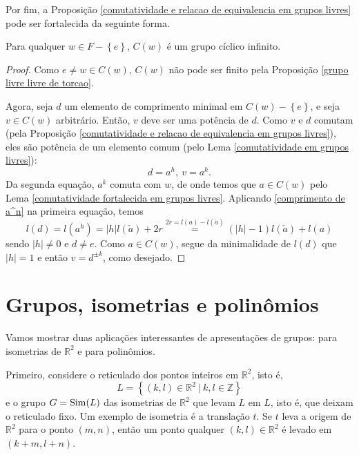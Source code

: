     	Por fim, a 
    	Proposição \ref{comutatividade e relacao de equivalencia em grupos livres} pode ser 
    	fortalecida da seguinte forma.
    	\begin{theorem}
    	\label{centralizadores em grupos livres}
    		Para qualquer $w\in F - \left\{ e \right\}$, $C(w)$ é um grupo cíclico infinito.
    	\end{theorem}
    	\begin{proof}
    		Como $e\neq w\in C(w)$, $C(w)$ não pode ser finito pela 
    		Proposição \ref{grupo livre livre de torcao}.
    		
    		\par\vspace{0.3cm} Agora, seja $d$ um elemento de comprimento minimal em 
    		$C(w) - \left\{ e \right\}$, e seja $v\in C(w)$ arbitrário. Então, $v$ deve ser uma potência de $d$.
    		Como $v$ e $d$ comutam (pela 
    		Proposição \ref{comutatividade e relacao de equivalencia em grupos livres}), eles são potência 
    		de um elemento comum (pelo Lema \ref{comutatividade em grupos livres}):
    		\begin{equation*}
    		    d = a^h, \ v = a^k.
    		\end{equation*}
    		Da segunda equação, $a^k$ comuta com $w$, de onde temos que $a\in C(w)$ 
    		pelo Lema \ref{comutatividade fortalecida em grupos livres}. Aplicando 
    		\eqref{comprimento de a^n} 
    		na primeira equação, temos
    		\begin{equation*}
    		    l(d) = l(a^h) 
    		    = |h|l(\check{a}) + 2r \stackrel{2r = l(a) - l(\check{a})}{=} (|h| - 1)l(\check{a}) + l(a)
    		\end{equation*}
    		sendo $|h|\neq 0$ e $d\neq e$. Como $a\in C(w)$, segue da minimalidade de 
    		$l(d)$ que $|h| = 1$ e então $v = d^{\pm k}$, como desejado.
    	\end{proof}
	\section{Grupos, isometrias e polinômios}
    	Vamos mostrar duas aplicações interessantes de apresentações de grupos: para isometrias 
    	de $\mathbb{R}^2$ e para polinômios.
    	
    	\par\vspace{0.3cm} Primeiro, considere o reticulado dos pontos inteiros em $\mathbb{R}^2$, isto é,
    	\begin{equation*}
    	    L = \left\{ (k,l)\in\mathbb{R}^2 \ | \ k,l\in\mathbb{Z} \right\}
    	\end{equation*}
    	e o grupo $G = \operatorname{Sim}(L)$ das isometrias de $\mathbb{R}^2$ que levam $L$ em $L$, 
    	isto é, que deixam o reticulado fixo. Um exemplo de isometria é a translação $t$. Se $t$ leva a 
    	origem de $\mathbb{R}^2$ para o ponto $(m,n)$, então um ponto qualquer $(k,l)\in\mathbb{R}^2$ é 
    	levado em $(k+m, l+n)$.
    	
